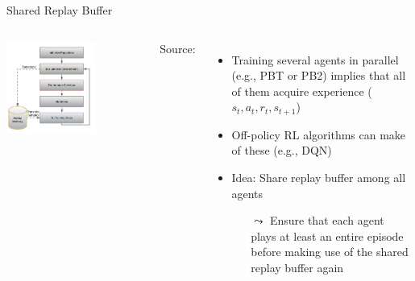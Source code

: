 \documentclass[aspectratio=169]{../latex_main/tntbeamer}  %
\begin{document}
\begin{frame}[c]{Shared Replay Buffer}

\begin{columns}


\centering
\includegraphics[width=0.65\textwidth]{images/searl.jpg}

\footnotesize
Source: 


\begin{itemize}
    \item Training several agents in parallel (e.g., PBT or PB2) implies that all of them acquire experience ($s_t, a_t, r_t, s_{t+1}$)
    \item Off-policy RL algorithms can make of these (e.g., DQN)
    \item Idea: Share replay buffer among all agents
    \begin{itemize}
        \item[$\leadsto$] Ensure that each agent plays at least an entire episode before making use of the shared replay buffer again
    \end{itemize}
\end{itemize}

\end{columns}


\end{frame}
\end{document}
